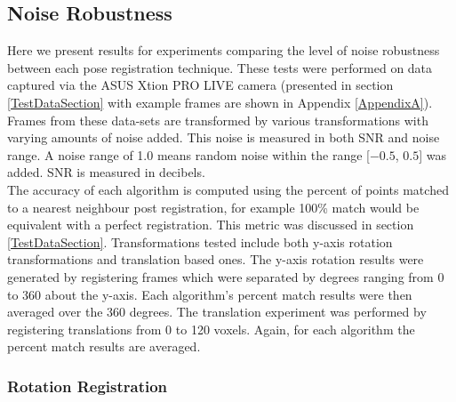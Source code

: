 
\subsection{Noise Robustness}


Here we present results for experiments comparing the level of noise robustness between each pose registration technique. These tests were performed on data captured via the ASUS Xtion PRO LIVE camera (presented in section \ref{TestDataSection} with example frames are shown in Appendix \ref{AppendixA}). Frames from these data-sets are transformed by various transformations with varying amounts of noise added. This noise is measured in both SNR and noise range. A noise range of 1.0 means random noise within the range [$-0.5$, $0.5$] was added. SNR is measured in decibels. \\

The accuracy of each algorithm is computed using the percent of points matched to a nearest neighbour post registration, for example 100\% match would be equivalent with a perfect registration. This metric was discussed in section \ref{TestDataSection}. Transformations tested include both y-axis rotation transformations and translation based ones. The y-axis rotation results were generated by registering frames which were separated by degrees ranging from 0 to 360 about the y-axis. Each algorithm's percent match results were then averaged over the 360 degrees. The translation experiment was performed by registering translations from 0 to 120 voxels. Again, for each algorithm the percent match results are averaged. \\


\subsubsection{Rotation Registration}

\begin{table}[!htb]
\centering
{}
\\
\caption{Average percent matched registration results for data rotated about the y-axis from 0 to 360 degrees under varying noise conditions.}
\label{table:YRNoiseT}
\end{table}


